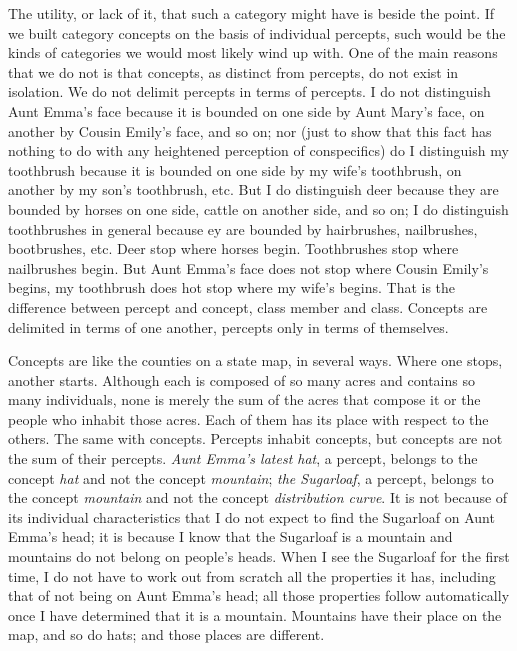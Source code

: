 The utility, or lack of it, that such a category might have is beside the point. If we built category concepts on the basis of individual percepts, such would be the kinds of categories we would most likely wind up with. One of the main reasons that we do not is that concepts, as distinct from percepts, do not exist in isolation. We do not delimit percepts in terms of percepts. I do not distinguish Aunt Emma's face because it is bounded on one side by Aunt Mary's face, on another by Cousin Emily's face, and so on; nor (just to show that this fact has nothing to do with any heightened perception of conspecifics) do I distinguish my toothbrush because it is bounded on one side by my wife's toothbrush, on another by my son's toothbrush, etc. But I do distinguish deer because they are bounded by horses on one side, cattle on another side, and so on; I do distinguish toothbrushes in general because ey are bounded by hairbrushes,
nailbrushes, bootbrushes, etc. Deer stop where horses begin. Toothbrushes stop where nailbrushes begin. But Aunt Emma's face does not stop where Cousin Emily's begins, my toothbrush does hot stop where my wife's begins. That is the difference between percept and concept, class member and class. Concepts are delimited in terms of one another, percepts only in terms of themselves.

Concepts are like the counties on a state map, in several ways. Where one stops, another starts. Although each is composed of so many acres and contains so many individuals, none is merely the sum of the acres that compose it or the people who inhabit those acres. Each of them has its place with respect to the others. The same with concepts. Percepts inhabit concepts, but concepts are not the sum of their percepts. \textit{Aunt Emma's latest hat}, a percept, belongs to the concept \textit{hat} and not the concept \textit{mountain}; \textit{the Sugarloaf}, a percept, belongs to the concept \textit{mountain} and not the concept \textit{distribution curve}. It is not because of its individual characteristics that I do not expect to find the Sugarloaf on Aunt Emma's head; it is because I know that the Sugarloaf is a mountain and mountains do not belong on people's heads. When I see the Sugarloaf for the first time, I do not have to work out from scratch all the properties it has, including that of not being on Aunt Emma's head; all those properties follow automatically once I have determined that it is a mountain. Mountains have their place on the map, and so do hats; and those places are different.

